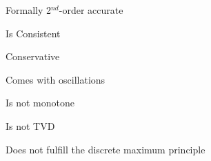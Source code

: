 \begin{sectionbox}
    \begin{proslist}
        \item Formally 2$^{nd}$-order accurate
        \item Is Consistent
        \item Conservative
    \end{proslist}
    \begin{conslist}
        \item Comes with oscillations
        \item Is not monotone
        \item Is not TVD
        \item Does not fulfill the discrete maximum principle
    \end{conslist}
\end{sectionbox}
